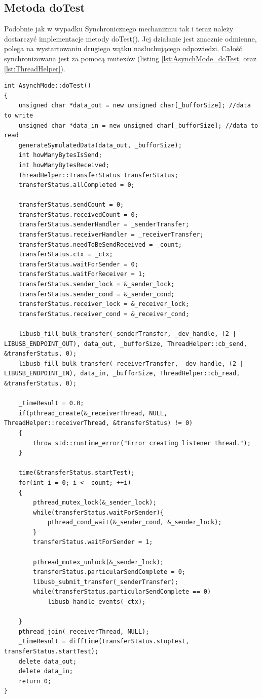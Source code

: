 \documentclass{BscUS}
\begin{document}
\subsection{Metoda doTest}
Podobnie jak w wypadku Synchronicznego mechanizmu tak i teraz należy dostarczyć implementacje metody doTest(). Jej działanie jest znacznie odmienne, polega na wystartowaniu drugiego wątku nasłuchującego odpowiedzi. Całość synchronizowana jest za pomocą mutexów (listing \ref{lst:AsynchMode_doTest} oraz \ref{lst:ThreadHelper}).
\begin{lstlisting}[caption={Metoda AsynchMode::doTest()},label={lst:AsynchMode_doTest}]
int AsynchMode::doTest()
{
	unsigned char *data_out = new unsigned char[_bufforSize]; //data to write
	unsigned char *data_in = new unsigned char[_bufforSize]; //data to read
	generateSymulatedData(data_out, _bufforSize);
	int howManyBytesIsSend; 
	int howManyBytesReceived;
	ThreadHelper::TransferStatus transferStatus;
	transferStatus.allCompleted = 0;
	
	transferStatus.sendCount = 0;
	transferStatus.receivedCount = 0;
	transferStatus.senderHandler = _senderTransfer;
	transferStatus.receiverHandler = _receiverTransfer;
	transferStatus.needToBeSendReceived = _count;
	transferStatus.ctx = _ctx;
	transferStatus.waitForSender = 0;
	transferStatus.waitForReceiver = 1;
	transferStatus.sender_lock = &_sender_lock;
	transferStatus.sender_cond = &_sender_cond;
	transferStatus.receiver_lock = &_receiver_lock;
	transferStatus.receiver_cond = &_receiver_cond;
	
	libusb_fill_bulk_transfer(_senderTransfer, _dev_handle, (2 | LIBUSB_ENDPOINT_OUT), data_out, _bufforSize, ThreadHelper::cb_send, &transferStatus, 0);
	libusb_fill_bulk_transfer(_receiverTransfer, _dev_handle, (2 | LIBUSB_ENDPOINT_IN), data_in, _bufforSize, ThreadHelper::cb_read, &transferStatus, 0);

	_timeResult = 0.0;
	if(pthread_create(&_receiverThread, NULL, ThreadHelper::receiverThread, &transferStatus) != 0)
	{
		throw std::runtime_error("Error creating listener thread.");
	}
	
	time(&transferStatus.startTest); 
	for(int i = 0; i < _count; ++i)
	{
		pthread_mutex_lock(&_sender_lock);
		while(transferStatus.waitForSender){
			pthread_cond_wait(&_sender_cond, &_sender_lock);
		}
		transferStatus.waitForSender = 1;

		pthread_mutex_unlock(&_sender_lock);
		transferStatus.particularSendComplete = 0;
		libusb_submit_transfer(_senderTransfer);
		while(transferStatus.particularSendComplete == 0)
			libusb_handle_events(_ctx);
		
	}
	pthread_join(_receiverThread, NULL);
	_timeResult = difftime(transferStatus.stopTest, transferStatus.startTest);
	delete data_out;
	delete data_in;
	return 0;
}

\end{lstlisting}
\end{document}
